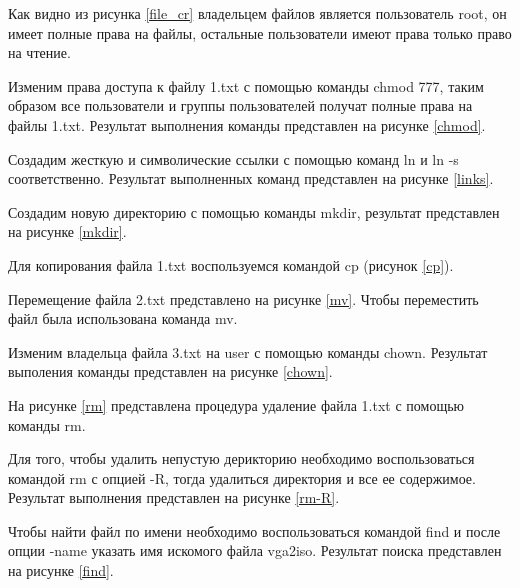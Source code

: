 Как видно из рисунка \ref{file_cr} владельцем файлов является пользователь root, он имеет полные права на файлы, остальные пользователи имеют права только право на чтение.

Изменим права доступа к файлу 1.txt с помощью команды chmod 777, таким образом все пользователи и группы пользователей получат полные права на файлы 1.txt. Результат выполнения команды представлен на рисунке \ref{chmod}.

\newpage
Создадим жесткую и символические ссылки с помощью команд ln и ln -s соответственно. Результат выполненных команд представлен на рисунке \ref{links}.

Создадим новую директорию с помощью команды mkdir, результат представлен на рисунке \ref{mkdir}.

Для копирования файла 1.txt воспользуемся командой cp (рисунок \ref{cp}). 

\newpage 
Перемещение файла 2.txt представлено на рисунке \ref{mv}. Чтобы переместить файл была использована команда mv.

Изменим владельца файла 3.txt на user с помощью команды chown. Результат выполения команды представлен на рисунке \ref{chown}.

На рисунке \ref{rm} представлена процедура удаление файла 1.txt с помощью команды rm.

Для того, чтобы удалить непустую дерикторию необходимо воспользоваться командой rm с опцией -R, тогда удалиться директория и все ее содержимое. Результат выполнения представлен на рисунке \ref{rm-R}.

Чтобы найти файл по имени необходимо воспользоваться командой find и после опции -name указать имя искомого файла vga2iso. Результат поиска представлен на рисунке \ref{find}.
